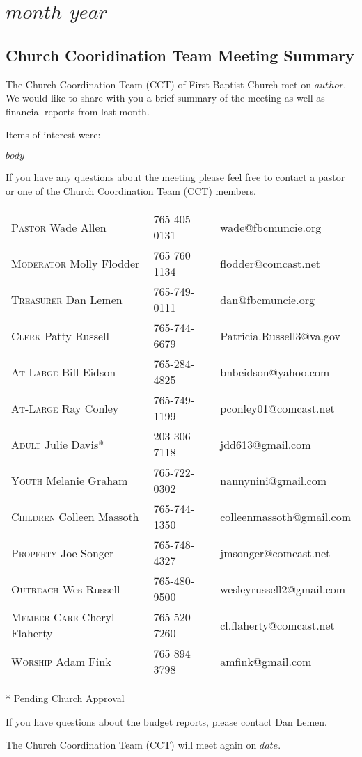 \documentclass[Letter, 11pt, twoside]{report}
\begin{document}
\part{$month$ $year$}
\chapter{Church Cooridination Team Meeting Summary}

The Church Coordination Team (CCT) of First Baptist Church met on $author$. We would like to share with you a brief summary of the meeting as well as financial reports from last month.

Items of interest were:

$body$

If you have any questions about the meeting please feel free to contact a pastor or one of the Church Coordination Team (CCT) members.

\begin{tabular}{@{}lll}
\textsc{Pastor} Wade Allen & 765-405-0131 & wade@fbcmuncie.org\\
\textsc{Moderator} Molly Flodder & 765-760-1134 & flodder@comcast.net\\
\textsc{Treasurer} Dan Lemen & 765-749-0111 & dan@fbcmuncie.org\\
\textsc{Clerk} Patty Russell & 765-744-6679 & Patricia.Russell3@va.gov \\
\textsc{At-Large} Bill Eidson & 765-284-4825 & bnbeidson@yahoo.com \\
\textsc{At-Large} Ray Conley & 765-749-1199 & pconley01@comcast.net\\
\textsc{Adult} Julie Davis* & 203-306-7118  & jdd613@gmail.com\\
\textsc{Youth} Melanie Graham & 765-722-0302 & nannynini@gmail.com\\
\textsc{Children} Colleen Massoth & 765-744-1350 & colleenmassoth@gmail.com\\
\textsc{Property} Joe Songer & 765-748-4327 & jmsonger@comcast.net\\
\textsc{Outreach} Wes Russell & 765-480-9500 & wesleyrussell2@gmail.com\\
\textsc{Member Care} Cheryl Flaherty & 765-520-7260 & cl.flaherty@comcast.net \\
  \textsc{Worship} Adam Fink & 765-894-3798  & amfink@gmail.com \\ 
\end{tabular}

* Pending Church Approval

If you have questions about the budget reports, please contact  
Dan Lemen.

The Church Coordination Team (CCT) will meet again on $date$. 




\end{document}
